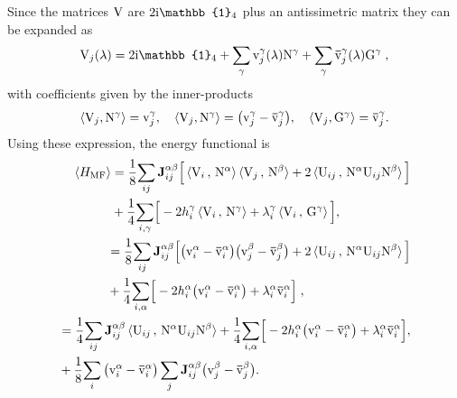 Since the matrices $\mathrm{V}$  are $2\im \mathbb{1}_4$ plus an antissimetric matrix they can be expanded as
\begin{equation}
    \rmV_{j}(\lambda) = 2\im \mathbb{1}_4 + \sum_\gamma \mathrm{v}^\gamma_j(\lambda)  \rmN^\gamma + \sum_\gamma \bar{\mathrm{v}}^\gamma_j(\lambda) \rmG^\gamma\;,
\end{equation}
with coefficients given by the inner-products
\begin{equation}
    \braket{ \rmV_{j} , \rmN^\gamma } =  \mathrm{v}^\gamma_j, \quad
    \braket{ \rmV_{j} , \rmN^\gamma } = \big( \mathrm{v}^\gamma_j - \bar{\mathrm{v}}^\gamma_j\big) , \quad
    \braket{ \rmV_{j} , \rmG^\gamma } =  \bar{\mathrm{v}}^\gamma_j .
\end{equation}
Using these expression, the energy functional is   %
\begin{align}
\begin{split}
    \braket{H_{\mathrm{MF}}  } &= %
    \frac{1}{8}\!\sum_{ij}  \mathbf{J}_{ij}^{\alpha\beta} \Big[
    \braket{ \rmV_{i} \, , \,  \rmN^\alpha } \braket{ \rmV_{j} \, , \,  \rmN^\beta }
       +2\braket{ \rmU_{ij} \, , \,  \rmN^\alpha   \rmU_{ij} \rmN^\beta }    \Big] \\ &
    +\frac{1}{4}\!\sum_{i, \gamma}  \!\Big[  -  2  h_i^\gamma \braket{ \rmV_{i} \, , \,  \rmN^\gamma }  + \lambda_i^\gamma \braket{ \rmV_{i} \, , \,  \rmG^\gamma } \Big]  ,
\end{split}\\
\begin{split}
     &=
   \frac{1}{8}\!\sum_{ij}  \mathbf{J}_{ij}^{\alpha\beta} \Big[  \big( \mathrm{v}^\alpha_i- \bar{\mathrm{v}}^\alpha_i\big)\big( \mathrm{v}^\beta_j- \bar{\mathrm{v}}^\beta_j\big)+2\braket{ \rmU_{ij} \, , \,  \rmN^\alpha   \rmU_{ij} \rmN^\beta }     \Big] \\
    &+\frac{1}{4}\!\sum_{i, \alpha}  \!\Big[ -2h_i^\alpha  \big( \mathrm{v}^\alpha_i - \bar{\mathrm{v}}^\alpha_i \big) + \lambda_i^\alpha \bar{\mathrm{v}}^\alpha_i \Big]   \; ,
\end{split}\\
\begin{split}
     &=
   \frac{1}{4}\!\sum_{ij}\mathbf{J}_{ij}^{\alpha\beta}  \braket{ \rmU_{ij} \, , \,  \rmN^\alpha   \rmU_{ij} \rmN^\beta }     +\frac{1}{4}\!\sum_{i, \alpha}  \!\Big[ -2{h}_i^\alpha  \big( \mathrm{v}^\alpha_i - \bar{\mathrm{v}}^\alpha_i \big) + \lambda_i^\alpha \bar{\mathrm{v}}^\alpha_i \Big]  ,  \\
   &+
   \frac{1}{8}\!\sum_{i}  \big( \mathrm{v}^\alpha_i- \bar{\mathrm{v}}^\alpha_i\big) \sum_{j}  \mathbf{J}_{ij}^{\alpha\beta}\big( \mathrm{v}^\beta_j- \bar{\mathrm{v}}^\beta_j\big).
\end{split}
\end{align}
